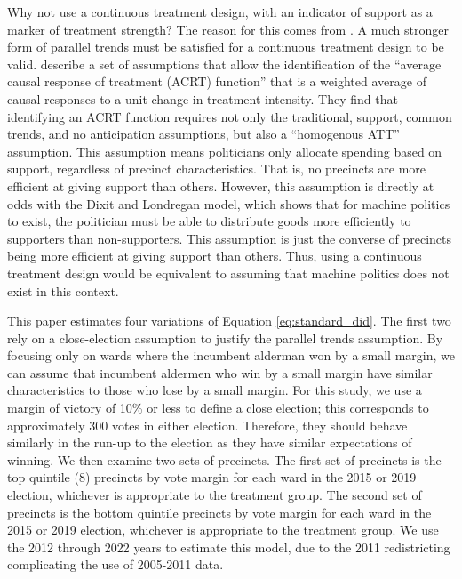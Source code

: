 Why not use a continuous treatment design, with an indicator of support as a marker of treatment strength?
The reason for this comes from \cite{callaway2021differenceindifferences_continuous}. 
A much stronger form of parallel trends must be satisfied for a continuous treatment design to be valid.
\cite{callaway2021differenceindifferences_continuous} describe a set of assumptions that allow the identification of the  ``average causal response of treatment (ACRT) function'' that is a weighted average of causal responses to a unit change in treatment intensity.
They find that identifying an ACRT function requires not only the traditional, support, common trends, and no anticipation assumptions, but also a ``homogenous ATT'' assumption. 
This assumption means politicians only allocate spending based on support, regardless of precinct characteristics.
That is, no precincts are more efficient at giving support than others.
However, this assumption is directly at odds with the Dixit and Londregan model, which shows that for machine politics to exist, the politician must be able to distribute goods more efficiently to supporters than non-supporters. 
This assumption is just the converse of precincts being more efficient at giving support than others.
Thus, using a continuous treatment design would be equivalent to assuming that machine politics does not exist in this context. 


This paper estimates four variations of Equation \ref{eq:standard_did}. 
The first two rely on a close-election assumption to justify the parallel trends assumption. 
By focusing only on wards where the incumbent alderman won by a small margin, we can assume that incumbent aldermen who win by a small margin have similar characteristics to those who lose by a small margin.
For this study, we use a margin of victory of 10\% or less to define a close election; this corresponds to approximately 300 votes in either election.
Therefore, they should behave similarly in the run-up to the election as they have similar expectations of winning.
We then examine two sets of precincts. 
The first set of precincts is the top quintile (8) precincts by vote margin for each ward in the 2015 or 2019 election, whichever is appropriate to the treatment group. 
The second set of precincts is the bottom quintile precincts by vote margin for each ward in the 2015 or 2019 election, whichever is appropriate to the treatment group.
We use the 2012 through 2022 years to estimate this model, due to the 2011 redistricting complicating the use of 2005-2011 data. 


